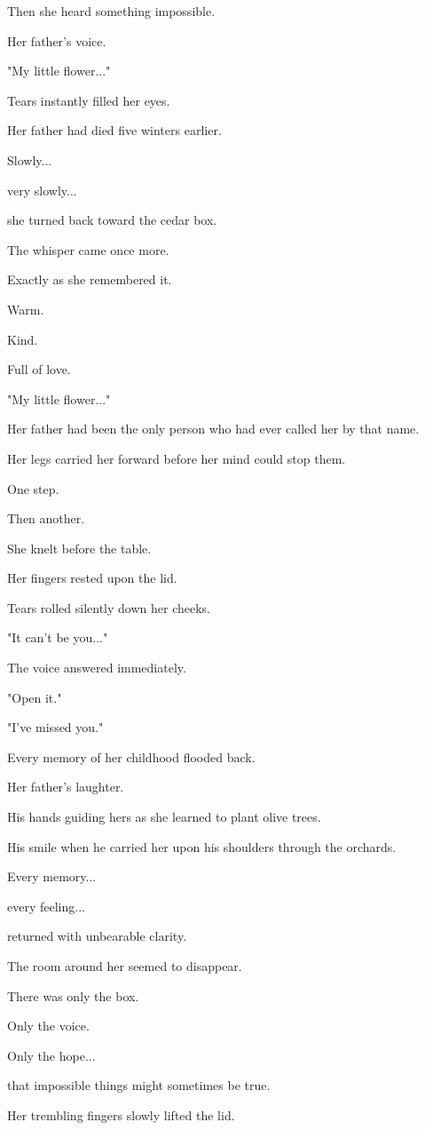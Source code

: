 \documentclass[12pt,openany]{book}
\begin{document}
Then she heard something impossible.

Her father's voice.

"My little flower..."

Tears instantly filled her eyes.

Her father had died five winters earlier.

Slowly...

very slowly...

she turned back toward the cedar box.

The whisper came once more.

Exactly as she remembered it.

Warm.

Kind.

Full of love.

"My little flower..."

Her father had been the only person who had ever called her by that name.

Her legs carried her forward before her mind could stop them.

One step.

Then another.

She knelt before the table.

Her fingers rested upon the lid.

Tears rolled silently down her cheeks.

"It can't be you..."

The voice answered immediately.

"Open it."

"I've missed you."

Every memory of her childhood flooded back.

Her father's laughter.

His hands guiding hers as she learned to plant olive trees.

His smile when he carried her upon his shoulders through the orchards.

Every memory...

every feeling...

returned with unbearable clarity.

The room around her seemed to disappear.

There was only the box.

Only the voice.

Only the hope...

that impossible things might sometimes be true.

Her trembling fingers slowly lifted the lid.
\end{document}
